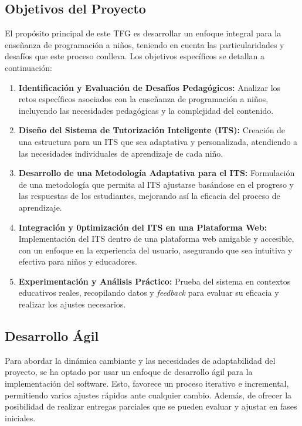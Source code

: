 \subsection{Objetivos del Proyecto}

El propósito principal de este TFG es desarrollar un enfoque integral para la enseñanza de programación a niños, teniendo en cuenta las particularidades y desafíos que este proceso conlleva. Los objetivos específicos se detallan a continuación:

\begin{enumerate}  
    \item \textbf{Identificación y Evaluación de Desafíos Pedagógicos:} Analizar los retos específicos asociados con la enseñanza de programación a niños, incluyendo las necesidades pedagógicas y la complejidad del contenido.
    
    \item \textbf{Diseño del Sistema de Tutorización Inteligente (ITS):} Creación de una estructura para un ITS que sea adaptativa y personalizada, atendiendo a las necesidades individuales de aprendizaje de cada niño.
    
    \item \textbf{Desarrollo de una Metodología Adaptativa para el ITS:} Formulación de una metodología que permita al ITS ajustarse basándose en el progreso y las respuestas de los estudiantes, mejorando así la eficacia del proceso de aprendizaje.
    
    \item \textbf{Integración y 0ptimización del ITS en una Plataforma Web:} Implementación del ITS dentro de una plataforma web amigable y accesible, con un enfoque en la experiencia del usuario, asegurando que sea intuitiva y efectiva para niños y educadores.
    
    \item \textbf{Experimentación y Análisis Práctico:} Prueba del sistema en contextos educativos reales, recopilando datos y \textit{feedback} para evaluar su eficacia y realizar los ajustes necesarios.
\end{enumerate}

\subsection{Desarrollo Ágil}

Para abordar la dinámica cambiante y las necesidades de adaptabilidad del proyecto, se ha optado por usar un enfoque de desarrollo ágil para la implementación del software. Esto, favorece un proceso iterativo e incremental, permitiendo varios ajustes rápidos ante cualquier cambio. Además, de ofrecer la posibilidad de realizar entregas parciales que se pueden evaluar y ajustar en fases iniciales.

